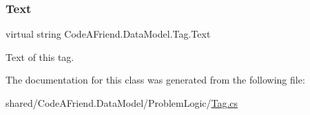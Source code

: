 \subsubsection{\texorpdfstring{Text}{Text}}
{\footnotesize\ttfamily virtual string Code\+A\+Friend.\+Data\+Model.\+Tag.\+Text\hspace{0.3cm}{\ttfamily [get]}}



Text of this tag. 



The documentation for this class was generated from the following file\+:\begin{DoxyCompactItemize}
\item 
shared/\+Code\+A\+Friend.\+Data\+Model/\+Problem\+Logic/\mbox{\hyperlink{_tag_8cs}{Tag.\+cs}}\end{DoxyCompactItemize}
